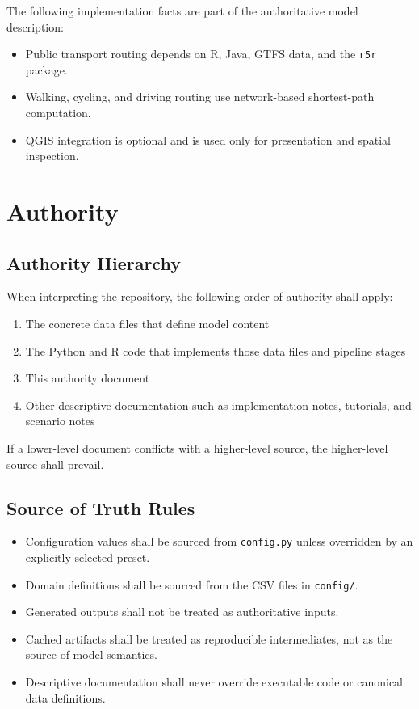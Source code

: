 \documentclass[11pt]{article}
\begin{document}
The following implementation facts are part of the authoritative model description:

\begin{itemize}
  \item Public transport routing depends on R, Java, GTFS data, and the \texttt{r5r} package.
  \item Walking, cycling, and driving routing use network-based shortest-path computation.
  \item QGIS integration is optional and is used only for presentation and spatial inspection.
\end{itemize}

\section{Authority}

\subsection*{Authority Hierarchy}

When interpreting the repository, the following order of authority shall apply:

\begin{enumerate}
  \item The concrete data files that define model content
  \item The Python and R code that implements those data files and pipeline stages
  \item This authority document
  \item Other descriptive documentation such as implementation notes, tutorials, and scenario notes
\end{enumerate}

If a lower-level document conflicts with a higher-level source, the higher-level source shall prevail.

\subsection*{Source of Truth Rules}

\begin{itemize}
  \item Configuration values shall be sourced from \texttt{config.py} unless overridden by an explicitly selected preset.
  \item Domain definitions shall be sourced from the CSV files in \texttt{config/}.
  \item Generated outputs shall not be treated as authoritative inputs.
  \item Cached artifacts shall be treated as reproducible intermediates, not as the source of model semantics.
  \item Descriptive documentation shall never override executable code or canonical data definitions.
\end{itemize}
\end{document}
